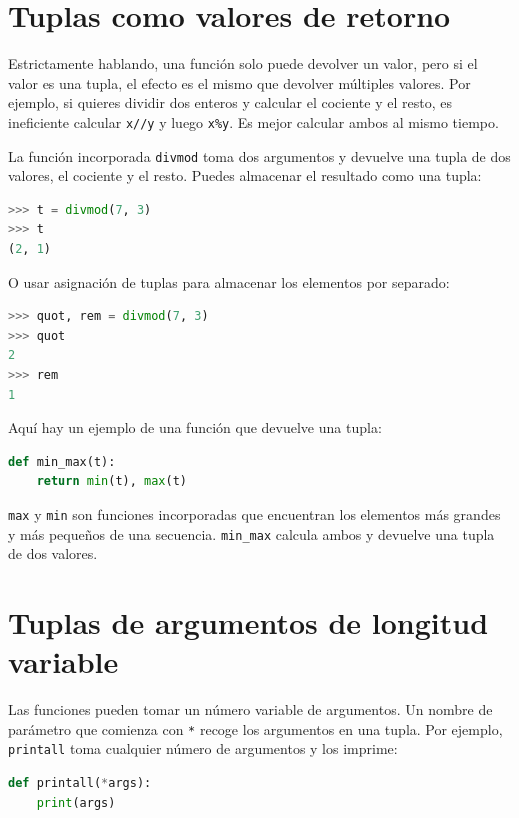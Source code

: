 \section{Tuplas como valores de retorno}

Estrictamente hablando, una función solo puede devolver un valor, pero si el valor es una tupla, el efecto es el mismo que devolver múltiples valores. Por ejemplo, si quieres dividir dos enteros y calcular el cociente y el resto, es ineficiente calcular \texttt{x//y} y luego \texttt{x\%y}. Es mejor calcular ambos al mismo tiempo.

La función incorporada \texttt{divmod} toma dos argumentos y devuelve una tupla de dos valores, el cociente y el resto. Puedes almacenar el resultado como una tupla:

\begin{lstlisting}[language=Python]
>>> t = divmod(7, 3)
>>> t
(2, 1)
\end{lstlisting}

O usar asignación de tuplas para almacenar los elementos por separado:

\begin{lstlisting}[language=Python]
>>> quot, rem = divmod(7, 3)
>>> quot
2
>>> rem
1
\end{lstlisting}

Aquí hay un ejemplo de una función que devuelve una tupla:

\begin{lstlisting}[language=Python]
def min_max(t):
    return min(t), max(t)
\end{lstlisting}

\texttt{max} y \texttt{min} son funciones incorporadas que encuentran los elementos más grandes y más pequeños de una secuencia. \texttt{min\_max} calcula ambos y devuelve una tupla de dos valores.

\section{Tuplas de argumentos de longitud variable}

Las funciones pueden tomar un número variable de argumentos. Un nombre de parámetro que comienza con \texttt{*} recoge los argumentos en una tupla. Por ejemplo, \texttt{printall} toma cualquier número de argumentos y los imprime:

\begin{lstlisting}[language=Python]
def printall(*args):
    print(args)
\end{lstlisting}

